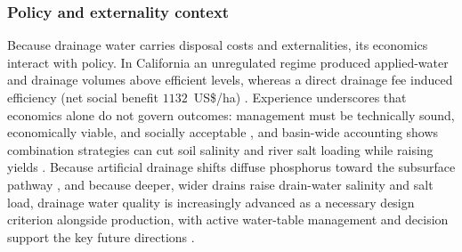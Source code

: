 \documentclass[11pt]{article}
\begin{document}
\subsubsection{Policy and externality context}

Because drainage water carries disposal costs and externalities, its economics
interact with policy. In California an unregulated regime produced applied-water
and drainage volumes above efficient levels, whereas a direct drainage fee
induced efficiency (net social benefit $1132$~US\$/ha)
\parencite{DINAR1989}. Experience underscores that economics alone do not govern
outcomes: management must be technically sound, economically viable, and socially
acceptable \parencite{Letey1999}, and basin-wide accounting shows combination
strategies can cut soil salinity and river salt loading while raising yields
\parencite{Burkhalter2006,Quinn2009,McDowell2021}. Because artificial drainage
shifts diffuse phosphorus toward the subsurface pathway
\parencite{Lucci2014,Allaire2011,Dadfar2010}, and because deeper, wider drains
raise drain-water salinity and salt load, drainage water quality is increasingly
advanced as a necessary design criterion alongside production, with active
water-table management and decision support the key future directions
\parencite{Ayars2015,Yannopoulos2020,Ritzema2023}.

\printbibliography
\end{document}
